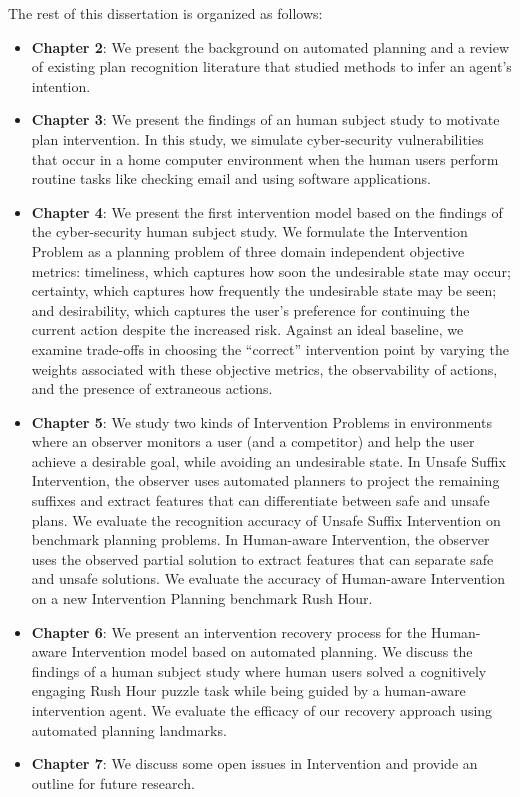 The rest of this dissertation is organized as follows:
\begin{itemize}
\item \textbf{Chapter 2}: We present the background on automated planning and a review of existing plan recognition literature that studied methods to infer an agent's intention.
\item \textbf{Chapter 3}: We present the findings of an human subject study to motivate plan intervention. In this study, we simulate cyber-security vulnerabilities that occur in a home computer environment when the human users perform routine tasks like checking email and using software applications.
\item \textbf{Chapter 4}: We present the first intervention model based on the findings of the cyber-security human subject study. 
We formulate the Intervention Problem as a  planning problem of three domain independent objective metrics: timeliness, which captures how soon the undesirable state may occur; certainty, which captures how frequently the undesirable state may be seen; and desirability, which captures the user’s preference for continuing the current action despite the increased risk. 
Against an ideal baseline, we examine trade-offs in choosing the ``correct'' intervention point by varying the weights associated with these objective metrics, the observability of actions, and the presence of extraneous actions.
\item \textbf{Chapter 5}: We study two kinds of Intervention Problems in environments where an observer monitors a user (and a competitor) and help the user achieve a desirable goal, while avoiding an undesirable state. 
In Unsafe Suffix Intervention, the observer uses automated planners to project the remaining suffixes and extract features that can differentiate between safe and unsafe plans. 
We evaluate the recognition accuracy of Unsafe Suffix Intervention on benchmark planning
problems. 
In Human-aware Intervention, the observer uses the observed partial solution to extract features that can separate safe and unsafe solutions. 
We evaluate the accuracy of Human-aware Intervention on a new Intervention Planning benchmark Rush Hour.
\item \textbf{Chapter 6}: We present an intervention recovery process for the Human-aware Intervention model based on automated planning. 
We discuss the findings of a human subject study where human users solved a cognitively engaging Rush Hour puzzle task while being guided by a human-aware intervention agent. 
We evaluate the efficacy of our recovery approach using automated planning landmarks.
\item \textbf{Chapter 7}: We discuss some open issues in Intervention and provide an outline for future research.
\end{itemize}
